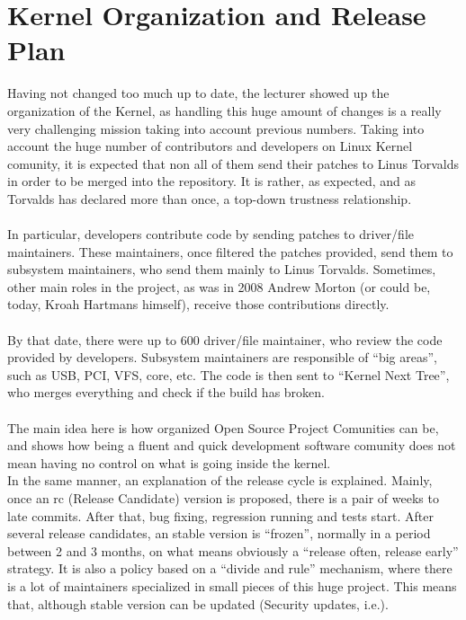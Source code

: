 \documentclass[11pt]{article}
\begin{document}
\section{Kernel Organization and Release Plan}
Having not changed too much up to date, the lecturer showed up the organization of the Kernel, as handling this huge amount of changes is a really very challenging mission taking into account previous numbers. Taking into account the huge number of contributors and developers on Linux Kernel comunity, it is expected that non all of them send their patches to Linus Torvalds in order to be merged into the repository. It is rather, as expected, and as Torvalds has declared more than once, a top-down trustness relationship.\\
\\
In particular, developers contribute code by sending patches to driver/file maintainers. These maintainers, once filtered the patches provided, send them to subsystem maintainers, who send them mainly to Linus Torvalds. Sometimes, other main roles in the project, as was in 2008 Andrew Morton (or could be, today, Kroah Hartmans himself), receive those contributions directly.\\
\\
By that date, there were up to 600 driver/file maintainer, who review the code provided by developers. Subsystem maintainers are responsible of ``big areas'', such as USB, PCI, VFS, core, etc. The code is then sent to ``Kernel Next Tree'', who merges everything and check if the build has broken.\\
\\
The main idea here is how organized Open Source Project Comunities can be, and shows how being a fluent and quick development software comunity does not mean having no control on what is going inside the kernel.\\
In the same manner, an explanation of the release cycle is explained. Mainly, once an rc (Release Candidate) version is proposed, there is a pair of weeks to late commits. After that, bug fixing, regression running and tests start. After several release candidates, an stable version is ``frozen'', normally in a period between 2 and 3 months, on what means obviously a ``release often, release early'' strategy. It is also a policy based on a ``divide and rule'' mechanism, where there is a lot of maintainers specialized in small pieces of this huge project. This means that, although stable version can be updated (Security updates, i.e.).\\
\end{document}
